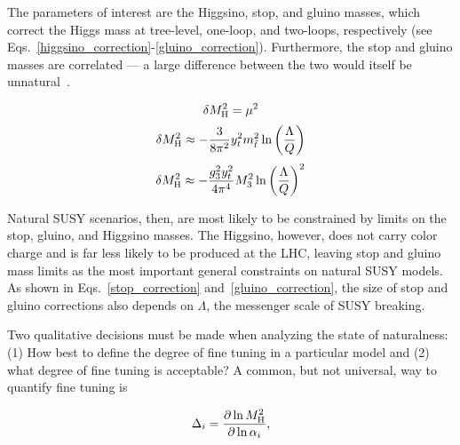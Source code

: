 \documentclass[12pt]{article}
\begin{document}
    The parameters of interest are the Higgsino, stop, and gluino masses, which correct the Higgs mass at tree-level, one-loop, and two-loops, respectively (see Eqs.~\ref{higgsino_correction}-\ref{gluino_correction}). Furthermore, the stop and gluino masses are correlated --- a large difference between the two would itself be unnatural~\cite{cornering}.

    \noindent \begin{equation}
        \delta M_{\mathrm{H}}^2 = \mu^2
        \label{higgsino_correction}
    \end{equation}
    \noindent \begin{equation}
        \delta M_{\mathrm{H}}^2 \approx - \frac{3}{8\pi^2} y_t^2 m_{\tilde{t}}^2 \ln{\left(\frac{\Lambda}{Q}\right)}
        \label{stop_correction}
    \end{equation}
    \noindent \begin{equation}
        \delta M_{\mathrm{H}}^2 \approx - \frac{g_3^2 y_t^2}{4\pi^4} M_3^2 \ln{\left(\frac{\Lambda}{Q}\right)}^2
        \label{gluino_correction}
    \end{equation}

    Natural SUSY scenarios, then, are most likely to be constrained by limits on the stop, gluino, and Higgsino masses. The Higgsino, however, does not carry color charge and is far less likely to be produced at the LHC, leaving stop and gluino mass limits as the most important general constraints on natural SUSY models. As shown in Eqs.~\ref{stop_correction} and~\ref{gluino_correction}, the size of stop and gluino corrections also depends on $\Lambda$, the messenger scale of SUSY breaking.

    Two qualitative decisions must be made when analyzing the state of naturalness: (1) How best to define the degree of fine tuning in a particular model and (2) what degree of fine tuning is acceptable? A common, but not universal, way to quantify fine tuning is
    
    \noindent \begin{equation}
        \Delta_i = \frac{\partial \ln{M_{\mathrm{H}}^2}}{\partial \ln{\alpha_i}} ,
        \label{fine_tuning}
    \end{equation}
\end{document}
